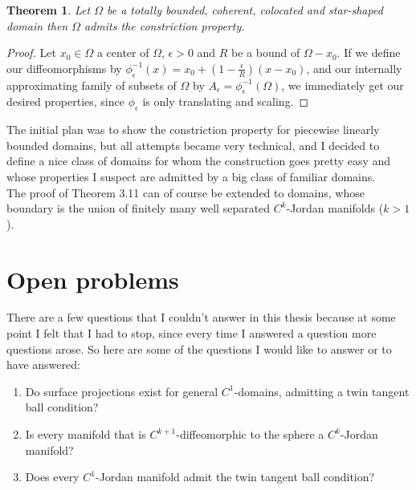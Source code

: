 \documentclass[11pt,a4paper,leqno]{report}
\newtheorem{theorem}{Theorem}[chapter]
\numberwithin{equation}{chapter}
\begin{document}
\begin{theorem} Let $\Omega$ be a totally bounded, coherent, colocated and star-shaped domain then $\Omega$ admits the constriction property.
\end{theorem}
\begin{proof} Let $x_0\in\Omega$ a center of $\Omega$, $\epsilon>0$ and $R$ be a bound of $\Omega-x_0$. If we define our diffeomorphisms by $\phi_\epsilon^{-1}(x)=x_0+(1-\frac{\epsilon}{R})(x-x_0)$, and our internally approximating family of subsets of $\Omega$ by $A_\epsilon=\phi_\epsilon^{-1}(\Omega)$, we immediately get our desired properties, since $\phi_\epsilon$ is only translating and scaling.
\end{proof}
The initial plan was to show the constriction property for piecewise linearly bounded domains, but all attempts became very technical, and I decided to define a nice class of domains for whom the construction goes pretty easy and whose properties I suspect are admitted by a big class of familiar domains. 
\\
The proof of Theorem 3.11 can of course be extended to domains, whose boundary is the union of finitely many well separated $C^k$-Jordan manifolds ($k>1$). 
\section{Open problems}
There are a few questions that I couldn't answer in this thesis because at some point I felt that I had to stop, since every time I answered a question more questions arose. So here are some of the questions I would like to answer or to have answered:
\begin{enumerate}
\item{Do surface projections exist for general $C^1$-domains, admitting a twin tangent ball condition?}
\item{Is every manifold that is $C^{k+1}$-diffeomorphic to the sphere a $C^k$-Jordan manifold?}
\item{Does every $C^1$-Jordan manifold admit the twin tangent ball condition?}
\end{enumerate}

\end{document}
